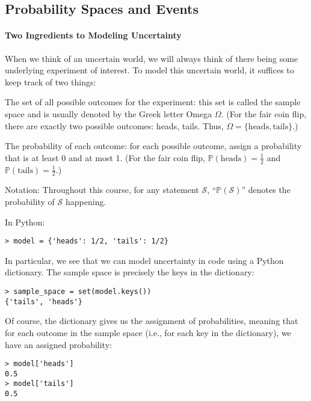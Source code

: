 \documentclass[6008notes.tex]{subfiles}
\begin{document}
\graphicspath{ {images/probspace/} }

\subsection{Probability Spaces and Events}

\paragraph{Two Ingredients to Modeling Uncertainty}

When we think of an uncertain world, we will always think of there being some underlying experiment of interest. To model this uncertain world, it suffices to keep track of two things:

The set of all possible outcomes for the experiment: this set is called the sample space and is usually denoted by the Greek letter Omega $\Omega$.
(For the fair coin flip, there are exactly two possible outcomes: heads, tails. Thus, $\Omega =\{ \text {heads},\text {tails}\}$.)

The probability of each outcome: for each possible outcome, assign a probability that is at least 0 and at most 1.
(For the fair coin flip, $\mathbb {P}(\text {heads})=\frac{1}{2}$ and $\mathbb {P}(\text {tails})=\frac{1}{2}$.)

Notation: Throughout this course, for any statement $\mathcal{S}$, ``$\mathbb {P}(\mathcal{S})$'' denotes the probability of $\mathcal{S}$ happening.

In Python:

\begin{lstlisting}
> model = {'heads': 1/2, 'tails': 1/2}
\end{lstlisting}
In particular, we see that we can model uncertainty in code using a Python dictionary. The sample space is precisely the keys in the dictionary:

\begin{lstlisting}
> sample_space = set(model.keys())
{'tails', 'heads'}
\end{lstlisting}
Of course, the dictionary gives us the assignment of probabilities, meaning that for each outcome in the sample space (i.e., for each key in the dictionary), we have an assigned probability:

\begin{lstlisting}
> model['heads']
0.5
> model['tails']
0.5
\end{lstlisting}
\end{document}
